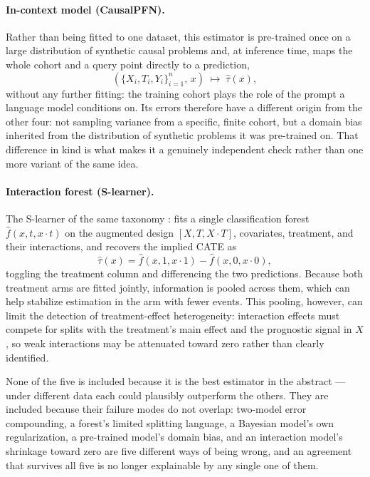 \paragraph{In-context model (CausalPFN).}
Rather than being fitted to one dataset, this estimator is pre-trained once on
a large distribution of synthetic causal problems \citep{balazadeh2025causalpfn} and, at inference time,
maps the whole cohort and a query point directly to a prediction,
\[
(\{X_i,T_i,Y_i\}_{i=1}^n,\, x) \;\longmapsto\; \hat\tau(x),
\]
without any further fitting: the training cohort plays the role of the
prompt a language model conditions on. Its errors
therefore have a different origin from the other four: not sampling variance
from a specific, finite cohort, but a domain bias inherited from the
distribution of synthetic problems it was pre-trained on. That difference in
kind is what makes it a genuinely independent check rather than one more
variant of the same idea.

\vspace{10pt}

\paragraph{Interaction forest (S-learner).}
The S-learner of the same taxonomy \citep{salditt2024}: fits a single classification forest $\hat f(x,t,x\cdot t)$ on the augmented
design $[X, T, X\cdot T]$, covariates, treatment, and their interactions, and
recovers the implied CATE as
\[
\hat\tau(x) = \hat f(x,1,x\cdot 1) - \hat f(x,0,x\cdot 0),
\]
toggling the treatment column and differencing the two predictions. Because both treatment arms are fitted jointly,
information is pooled across them, which can help stabilize estimation in
the arm with fewer events. This pooling, however, can limit the detection of
treatment-effect heterogeneity: interaction effects must compete for splits
with the treatment's main effect and the prognostic signal in $X$, so weak
interactions may be attenuated toward zero rather than clearly identified.

\vspace{10pt}

None of the five is included because it is the best estimator in the
abstract — under different data each could plausibly outperform the others.
They are included because their failure modes do not overlap: two-model
error compounding, a forest's limited splitting language, a Bayesian model's
own regularization, a pre-trained model's domain bias, and an interaction
model's shrinkage toward zero are five different ways of being wrong, and an
agreement that survives all five is no longer explainable by any single one
of them.

